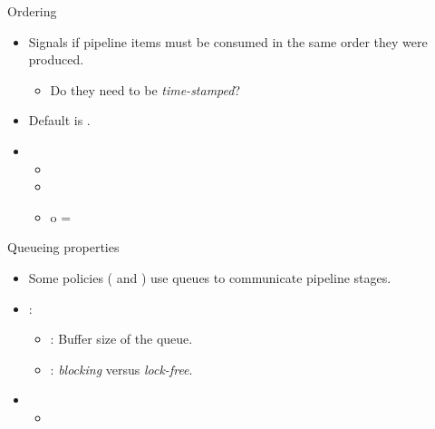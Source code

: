 \begin{frame}[t]{Ordering}
\begin{itemize}
  \item Signals if pipeline items must be consumed in the same order they were produced.
    \begin{itemize}
      \item Do they need to be \emph{time-stamped}?
    \end{itemize}

  \vfill
  \item Default is .

  \vfill
  \item {}
    \begin{itemize}
      \item {}
      \item {}
      \item {} o = 
    \end{itemize}
\end{itemize}
\end{frame}

\begin{frame}[t]{Queueing properties}
\begin{itemize}
  \item Some policies ( and ) use queues to
        communicate pipeline stages.

  \vfill
  \item {}:
    \begin{itemize}
      \item {}: Buffer size of the queue.
      \item {}: \emph{blocking} versus \emph{lock-free}.
    \end{itemize}

  \vfill
  \item {}
    \begin{itemize}
      \item {}
    \end{itemize}
\end{itemize}
\end{frame}

